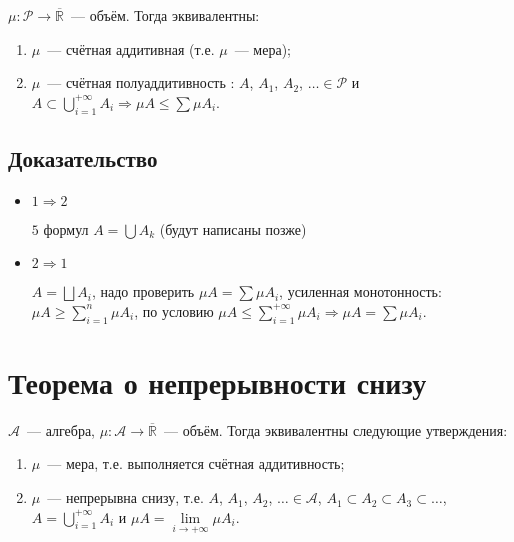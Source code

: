 \documentclass{article}
\begin{document}
        $\mu : \mathcal{P} \rightarrow \overline{\mathbb{R}}$~--- объём. Тогда эквивалентны:
        
        \begin{enumerate}
        
            \item $\mu$~--- счётная аддитивная (т.е. $\mu$~--- мера);
            
            \item $\mu$~--- счётная полуаддитивность : $A$, $A_1$, $A_2$, $\ldots \in \mathcal{P}$ и $A \subset \bigcup\limits^{+\infty}_{i = 1} A_i \Rightarrow \mu A \leq \sum \mu A_i$.
            
        \end{enumerate}
        
        \subsection{Доказательство}
        
            \begin{itemize}
            
                \item $1 \Rightarrow 2$
                
                    $5$ формул $A = \bigcup A_k$ (будут написаны позже)
                    
                \item $2 \Rightarrow 1$
                
                    $A = \bigsqcup A_i$, надо проверить $\mu A = \sum \mu A_i$, усиленная монотонность: $\mu A \geq \sum\limits^n_{i = 1} \mu A_i$, по условию $\mu A \leq \sum\limits^{+\infty}_{i = 1} \mu A_i \Rightarrow \mu A = \sum \mu A_i$.
                        
            \end{itemize}
            
    \newpage
    
    \section{Теорема о непрерывности снизу}
    
        $\mathcal{A}$~--- алгебра, $\mu : \mathcal{A} \rightarrow \overline{\mathbb{R}}$~--- объём. Тогда эквивалентны следующие утверждения:
        
        \begin{enumerate}
        
            \item $\mu$~--- мера, т.е. выполняется счётная аддитивность;
            
            \item $\mu$~--- непрерывна снизу, т.е. $A$, $A_1$, $A_2$, $\ldots \in \mathcal{A}$, $A_1 \subset A_2 \subset A_3 \subset \ldots$, $A = \bigcup\limits^{+\infty}_{i = 1} A_i$ и $\mu A = \lim\limits_{i \rightarrow +\infty} \mu A_i$.
            
        \end{enumerate}
        
\end{document}
